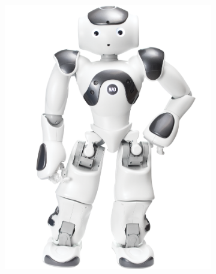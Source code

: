 \begin{figure}
  \centering
  \begin{subfigure}[b]{0.4\textwidth}
    \includegraphics[width=\textwidth]{figures/NAO-v6.png}
    \caption{}
    \label{fig:nao-v6}
  \end{subfigure}
  \begin{subfigure}[b]{0.4\textwidth}

\end{subfigure}
\end{figure}
